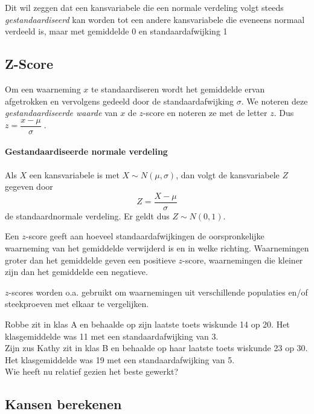 \documentclass[a4paper,12pt, twoside]{article}
\begin{document}
Dit wil zeggen dat een kansvariabele die een normale verdeling volgt steeds {\em gestandaardiseerd} kan worden tot een andere kansvariabele die eveneens normaal verdeeld is, maar met gemiddelde 0 en standaardafwijking 1

\subsection{Z-Score}

Om een waarneming $x$ te standaardiseren wordt het gemiddelde ervan afgetrokken en vervolgens gedeeld door de standaardafwijking $\sigma$. We noteren deze {\em gestandaardiseerde waarde} van $x$ de $z$-score en noteren ze met de letter $z$. Dus
$z=\dfrac{x-\mu}{\sigma}\;.$

\paragraph*{Gestandaardiseerde normale verdeling}
\begin{mdframed}
Als $X$ een kansvariabele is met $X\sim N(\mu,\sigma)$, dan volgt de kansvariabele $Z$ gegeven door
$$Z=\dfrac{X-\mu}{\sigma}$$
de standaardnormale verdeling. Er geldt dus $Z\sim N(0,1)$.
\end{mdframed}

Een $z$-score geeft aan hoeveel standaardafwijkingen de oorspronkelijke waarneming van het gemiddelde verwijderd is en in welke richting. Waarnemingen groter dan het gemiddelde geven een positieve $z$-score, waarnemingen die kleiner zijn dan het gemiddelde een negatieve.

$z$-scores worden o.a. gebruikt om waarnemingen uit verschillende populaties en/of steekproeven met elkaar te vergelijken.

\begin{oefening}
Robbe zit in klas A en behaalde op zijn laatste toets wiskunde 14 op 20. Het klasgemiddelde was 11 met een standaardafwijking van 3.\\
Zijn zus Kathy zit in klas B en behaalde op haar laatste toets wiskunde 23 op 30. Het klasgemiddelde was 19 met een standaardafwijking van 5.\\
Wie heeft nu relatief gezien het beste gewerkt?
\end{oefening}

\subsection{Kansen berekenen}
\end{document}
